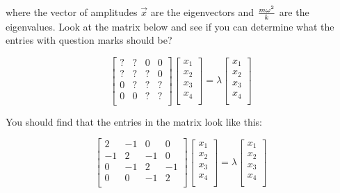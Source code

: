 \begin{enumerate}
\begin{enumerate}
where the vector of amplitudes $\vec{x}$ are the eigenvectors and ${m
  \omega^2\over k}$ are the eigenvalues.    Look at the matrix below
and see if you can determine what the entries with question marks
should be?

\begin{equation}
\left[
\begin{array}{cccccccc}
? & ? & 0 & 0\\
? & ?  & ? & 0 \\
0 & ? & ?  & ?\\
0 & 0 & ? & ?\\
\end{array}
\right]
\left[
\begin{array}{r}
x_1 \\
x_2 \\
x_3  \\
x_4   \\
\end{array}
\right]
= \lambda
\left[
\begin{array}{r}
x_1   \\
x_2 \\
x_3 \\
x_4  \\
\end{array}
\right]
\end{equation}


You should find that the entries in the matrix look like this:

\begin{equation}
\left[
\begin{array}{cccccccc}
2 & -1 & 0 & 0\\
-1 & 2  & -1 & 0 \\
0 & -1 & 2  & -1\\
0 & 0 & -1 & 2\\
\end{array}
\right]
\left[
\begin{array}{r}
x_1 \\
x_2 \\
x_3  \\
x_4   \\
\end{array}
\right]
= \lambda
\left[
\begin{array}{r}
x_1   \\
x_2 \\
x_3 \\
x_4  \\
\end{array}
\right]
\end{equation}


\end{enumerate}
\end{enumerate}
